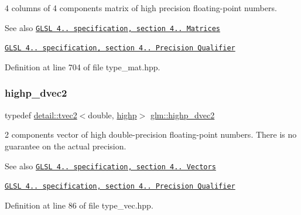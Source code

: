 4 columns of 4 components matrix of high precision floating-\/point numbers.

\begin{DoxySeeAlso}{See also}
\href{http://www.opengl.org/registry/doc/GLSLangSpec.4.20.8.pdf}{\tt G\+L\+SL 4.. specification, section 4.. Matrices} 

\href{http://www.opengl.org/registry/doc/GLSLangSpec.4.20.8.pdf}{\tt G\+L\+SL 4.. specification, section 4.. Precision Qualifier} 
\end{DoxySeeAlso}


Definition at line 704 of file type\+\_\+mat.\+hpp.

\mbox{\label{group__core__precision_gacfbe8512142fff27f0bfb44958c1752f}} 
\subsubsection{\texorpdfstring{highp\+\_\+dvec2}{highp\_dvec2}}
{\footnotesize\ttfamily typedef \hyperlink{structglm_1_1detail_1_1tvec2}{detail\+::tvec2}$<$double, \hyperlink{namespaceglm_a0f04f086094c747d227af4425893f545ac6f7eab42eacbb10d59a58e95e362074}{highp}$>$ \hyperlink{group__core__precision_gacfbe8512142fff27f0bfb44958c1752f}{glm\+::highp\+\_\+dvec2}}

2 components vector of high double-\/precision floating-\/point numbers. There is no guarantee on the actual precision.

\begin{DoxySeeAlso}{See also}
\href{http://www.opengl.org/registry/doc/GLSLangSpec.4.20.8.pdf}{\tt G\+L\+SL 4.. specification, section 4.. Vectors} 

\href{http://www.opengl.org/registry/doc/GLSLangSpec.4.20.8.pdf}{\tt G\+L\+SL 4.. specification, section 4.. Precision Qualifier} 
\end{DoxySeeAlso}


Definition at line 86 of file type\+\_\+vec.\+hpp.

\mbox{\label{group__core__precision_ga4962711854156dae8ebb4eb39237c542}} 
